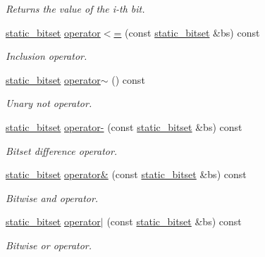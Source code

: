 \begin{DoxyCompactItemize}
\begin{DoxyCompactList}\small\item\em Returns the value of the i-\/th bit. \end{DoxyCompactList}\item 
\hyperlink{classlgraph_1_1utils_1_1static__bitset}{static\-\_\-bitset} \hyperlink{classlgraph_1_1utils_1_1static__bitset_a8c1e2397655865931a61dac90603e107}{operator$<$=} (const \hyperlink{classlgraph_1_1utils_1_1static__bitset}{static\-\_\-bitset} \&bs) const 
\begin{DoxyCompactList}\small\item\em Inclusion operator. \end{DoxyCompactList}\item 
\hyperlink{classlgraph_1_1utils_1_1static__bitset}{static\-\_\-bitset} \hyperlink{classlgraph_1_1utils_1_1static__bitset_a1cbeed2b62a4b9fe5eecf61d498a39ae}{operator$\sim$} () const 
\begin{DoxyCompactList}\small\item\em Unary not operator. \end{DoxyCompactList}\item 
\hyperlink{classlgraph_1_1utils_1_1static__bitset}{static\-\_\-bitset} \hyperlink{classlgraph_1_1utils_1_1static__bitset_a9042acb0366c5a9bfe0dc629b3bdd08a}{operator-\/} (const \hyperlink{classlgraph_1_1utils_1_1static__bitset}{static\-\_\-bitset} \&bs) const 
\begin{DoxyCompactList}\small\item\em Bitset difference operator. \end{DoxyCompactList}\item 
\hyperlink{classlgraph_1_1utils_1_1static__bitset}{static\-\_\-bitset} \hyperlink{classlgraph_1_1utils_1_1static__bitset_a312e62c57a19b230fae738aadd184df0}{operator\&} (const \hyperlink{classlgraph_1_1utils_1_1static__bitset}{static\-\_\-bitset} \&bs) const 
\begin{DoxyCompactList}\small\item\em Bitwise {\itshape and} operator. \end{DoxyCompactList}\item 
\hyperlink{classlgraph_1_1utils_1_1static__bitset}{static\-\_\-bitset} \hyperlink{classlgraph_1_1utils_1_1static__bitset_a08f50dadf7a22b4372e8d7e1d57c0670}{operator$\vert$} (const \hyperlink{classlgraph_1_1utils_1_1static__bitset}{static\-\_\-bitset} \&bs) const 
\begin{DoxyCompactList}\small\item\em Bitwise {\itshape or} operator. \end{DoxyCompactList}\item 

\end{DoxyCompactItemize}
